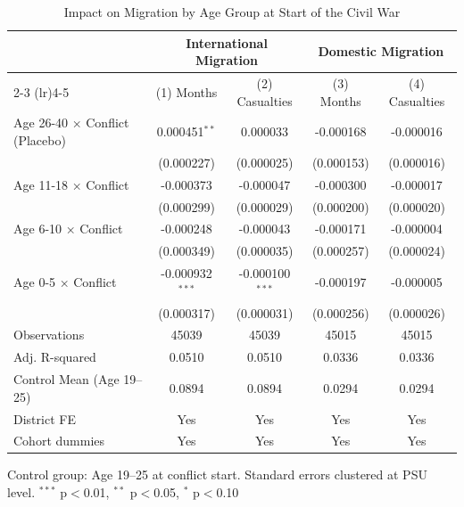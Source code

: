 \begin{table}[htbp]
\centering
\footnotesize
\caption{Impact on Migration by Age Group at Start of the Civil War}
\label{tab:did_agegroups}
\begin{tabular}{l cccc}
\toprule
 & \multicolumn{2}{c}{International Migration} & \multicolumn{2}{c}{Domestic Migration} \\
\cmidrule(lr){2-3} \cmidrule(lr){4-5}
 & (1) Months & (2) Casualties & (3) Months & (4) Casualties \\
\midrule
\quad Age 26-40 × Conflict (Placebo) & 0.000451$^{**}$ & 0.000033 & -0.000168 & -0.000016 \\
 & (0.000227) & (0.000025) & (0.000153) & (0.000016) \\
\quad Age 11-18 × Conflict & -0.000373 & -0.000047 & -0.000300 & -0.000017 \\
 & (0.000299) & (0.000029) & (0.000200) & (0.000020) \\
\quad Age 6-10 × Conflict & -0.000248 & -0.000043 & -0.000171 & -0.000004 \\
 & (0.000349) & (0.000035) & (0.000257) & (0.000024) \\
\quad Age 0-5 × Conflict & -0.000932$^{***}$ & -0.000100$^{***}$ & -0.000197 & -0.000005 \\
 & (0.000317) & (0.000031) & (0.000256) & (0.000026) \\
\midrule
Observations & 45039 & 45039 & 45015 & 45015 \\
Adj. R-squared & 0.0510 & 0.0510 & 0.0336 & 0.0336 \\
Control Mean (Age 19--25) & 0.0894 & 0.0894 & 0.0294 & 0.0294 \\
District FE & Yes & Yes & Yes & Yes \\
Cohort dummies & Yes & Yes & Yes & Yes \\
\bottomrule
\end{tabular}
\begin{tablenotes}
\footnotesize
\item Control group: Age 19--25 at conflict start. Standard errors clustered at PSU level. $^{***}$ p$<$0.01, $^{**}$ p$<$0.05, $^{*}$ p$<$0.10
\end{tablenotes}
\end{table}

\clearpage

